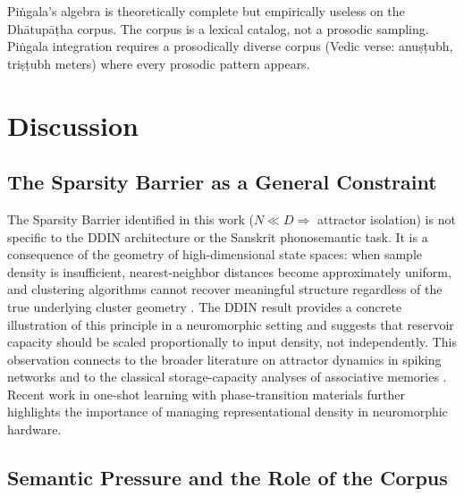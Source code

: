 \documentclass{article}
\begin{document}
Piṅgala's algebra is theoretically complete but empirically useless on the
Dhātupāṭha corpus. The corpus is a lexical catalog, not a prosodic sampling.
Piṅgala integration requires a prosodically diverse corpus (Vedic verse:
anuṣṭubh, triṣṭubh meters) where every prosodic pattern appears.

\section{Discussion}

\subsection{The Sparsity Barrier as a General Constraint}

The Sparsity Barrier identified in this work ($N \ll D \Rightarrow$ attractor isolation)
is not specific to the DDIN architecture or the Sanskrit phonosemantic task. It is a
consequence of the geometry of high-dimensional state spaces: when sample density is
insufficient, nearest-neighbor distances become approximately uniform, and clustering
algorithms cannot recover meaningful structure regardless of the true underlying
cluster geometry \citep{bellman1961curse,hopfield1982,hebb1949}. The DDIN result provides a concrete
illustration of this principle in a neuromorphic setting and suggests that reservoir
capacity should be scaled proportionally to input density, not independently. This
observation connects to the broader literature on attractor dynamics in spiking networks
\citep{amit1997,brunel2000,talukder2025neuromorphic} and to the classical storage-capacity analyses of
associative memories \citep{gardner1988,mezard1987}. Recent work in one-shot learning
with phase-transition materials \citep{pnas2024phase} further highlights the importance
of managing representational density in neuromorphic hardware.

\subsection{Semantic Pressure and the Role of the Corpus}
\end{document}
